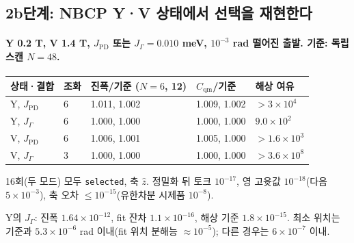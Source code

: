 \subsection{2b단계: NBCP Y·V 상태에서 선택을 재현한다}\label{stage2b-verification}
\begingroup%
  \framesubtitle{Y 0.2 T, V 1.4 T, $J_{\mathrm{PD}}$ 또는 $J_\Gamma=0.010$ meV, $10^{-3}$ rad 떨어진 출발. 기준: 독립 스캔 $N=48$.}
  \small
  \begin{tabularx}{\textwidth}{@{}YP{1.1cm}P{2.0cm}P{2.0cm}P{1.6cm}@{}}
    \toprule
    상태·결합 & 조화 & 진폭/기준 ($N=6$, 12) & $C_{\mathrm{qm}}$/기준 & 해상 여유 \\
    \midrule
    Y, $J_{\mathrm{PD}}$ & 6 & 1.011, 1.002 & 1.009, 1.002 & $>3\times10^{4}$ \\
    Y, $J_\Gamma$ & 6 & 1.000, 1.000 & 1.000, 1.000 & $9.0\times10^{2}$ \\
    V, $J_{\mathrm{PD}}$ & 6 & 1.006, 1.001 & 1.005, 1.000 & $>1.6\times10^{3}$ \\
    V, $J_\Gamma$ & 3 & 1.000, 1.000 & 1.000, 1.000 & $>3.6\times10^{8}$ \\
    \bottomrule
  \end{tabularx}
  \par\medskip
  16회(두 모드) 모두 \texttt{selected}, 축 $\hat z$. 정밀화 뒤 토크 $10^{-17}$, 영 고윳값 $10^{-18}$(다음 $5\times10^{-3}$), 축 오차 $\le10^{-15}$(유한차분 시제품 $10^{-8}$).
  \par\medskip
  Y의 $J_\Gamma$: 진폭 $1.64\times10^{-12}$, fit 잔차 $1.1\times10^{-16}$, 해상 기준 $1.8\times10^{-15}$. 최소 위치는 기준과 $5.3\times10^{-6}$ rad 이내(fit 위치 분해능 $\approx10^{-5}$); 다른 경우는 $6\times10^{-7}$ 이내.
  \par\medskip
\endgroup


